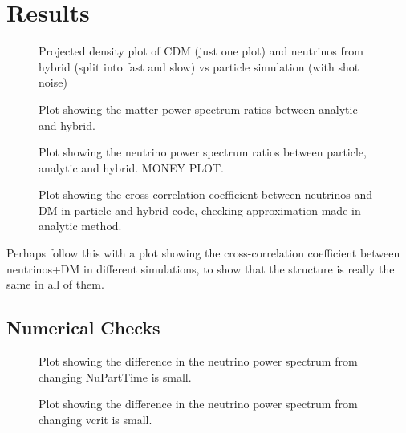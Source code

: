 \documentclass[useAMS, usenatbib]{mnras}
\begin{document}

%

\section{Results}
\label{sec:results}

\begin{figure}
  \caption{Projected density plot of CDM (just one plot) and neutrinos from hybrid (split into fast and slow) vs particle simulation (with shot noise)}
  \label{fig:density_plot}
\end{figure}

\begin{figure}
  \caption{Plot showing the matter power spectrum ratios between analytic and hybrid. }
  \label{fig:matter_power}
\end{figure}

\begin{figure}
  \caption{Plot showing the neutrino power spectrum ratios between particle, analytic and hybrid.
  MONEY PLOT.}
  \label{fig:neutrino_power}
\end{figure}

\begin{figure}
  \caption{Plot showing the cross-correlation coefficient between neutrinos
  and DM in particle and hybrid code, checking approximation made in analytic method.}
  \label{fig:cross-corr}
\end{figure}

Perhaps follow this with a plot showing the cross-correlation coefficient between neutrinos+DM
in different simulations, to show that the structure is really the same in all of them.


\subsection{Numerical Checks}

\begin{figure}
  \caption{Plot showing the difference in the neutrino power spectrum from changing NuPartTime is small. }
  \label{fig:nuparttime}
\end{figure}

\begin{figure}
  \caption{Plot showing the difference in the neutrino power spectrum from changing vcrit is small. }
  \label{fig:vcrit}
\end{figure}
\end{document}
